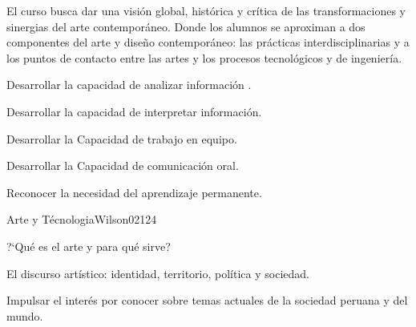 \begin{syllabus}


\begin{justification}
El curso busca  dar  una visión  global, histórica  y crítica de las transformaciones y sinergias del arte contemporáneo. Donde los alumnos se aproximan a dos componentes del arte y diseño contemporáneo: las prácticas interdisciplinarias  y a los puntos de contacto entre las artes y los procesos tecnológicos y de ingeniería.
\end{justification}

\begin{goals}
    \item Desarrollar la capacidad de analizar información .
    \item Desarrollar la capacidad de interpretar información.
    \item Desarrollar la Capacidad de trabajo en equipo.
    \item Desarrollar la Capacidad de comunicación oral.
    \item Reconocer la necesidad del aprendizaje permanente.
\end{goals}

\begin{outcomes}
    \item {} %
    \item {} %
    \item {} %
    \item {} %
    \item {} %
\end{outcomes}

\begin{competences}
    \item {}
    \item {}
    \item {}
    \item {}
\end{competences}

\begin{unit}{Arte y Técnologia}{}{Wilson02}{12}{4}
   \begin{topics}
      \item ?`Qué es el arte y para qué sirve?
      \item El discurso artístico: identidad, territorio, política y sociedad.
   \end{topics}
   \begin{learningoutcomes}
      \item Impulsar el interés por conocer sobre temas actuales de la sociedad peruana y del mundo.
   \end{learningoutcomes}
\end{unit}


\end{syllabus}
